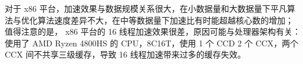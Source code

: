 \documentclass[a4paper]{article}
\begin{document}
对于 x86 平台，加速效果与数据规模关系很大，在小数据量和大数据量下平凡算法与优化算法速度差异不大，在中等数据量下加速比有时能超越核心数的增加；
值得注意的是， x86 平台的 16 线程加速效果很差，原因可能与处理器架构有关：使用了 AMD Ryzen 4800HS 的 CPU，8C16T，使用 1 个 CCD 2 个 CCX，两个 CCX 间不共享三级缓存，导致 16 线程加速带来过多的缓存失效。



% 
% 
\end{document}
